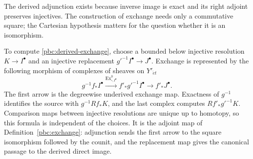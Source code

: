 \documentclass[11pt,a4paper]{article}
\numberwithin{equation}{section}
\theoremstyle{definition}
\theoremstyle{remark}
\newcommand{\et}{\acute{e}t}
\begin{document}
The derived adjunction exists because inverse image is exact and its
right adjoint preserves injectives. The construction of exchange needs
only a commutative square; the Cartesian hypothesis matters for the
question whether it is an isomorphism.

To compute \eqref{pbc:derived-exchange}, choose a bounded below
injective resolution $K\to I^\bullet$ and an injective replacement
$g'^{-1}I^\bullet\to J^\bullet$. Exchange is represented by the
following morphism of complexes of sheaves on $Y'_{\et}$
\begin{equation}\label{pbc:exchange-resolution}
 g^{-1}f_*I^\bullet
 \xrightarrow{\operatorname{Ex}^0_{\square,I^\bullet}}
 f'_*g'^{-1}I^\bullet\longrightarrow f'_*J^\bullet.
\end{equation}
The first arrow is the degreewise underived exchange map. Exactness of
$g^{-1}$ identifies the source with $g^{-1}Rf_*K$, and the last complex
computes $Rf'_*g'^{-1}K$. Comparison maps between injective resolutions
are unique up to homotopy, so this formula is independent of the
choices. It is the adjoint map of Definition~\ref{pbc:exchange}:
adjunction sends the first arrow to the square isomorphism followed by
the counit, and the replacement map gives the canonical passage to the
derived direct image.
\end{document}
